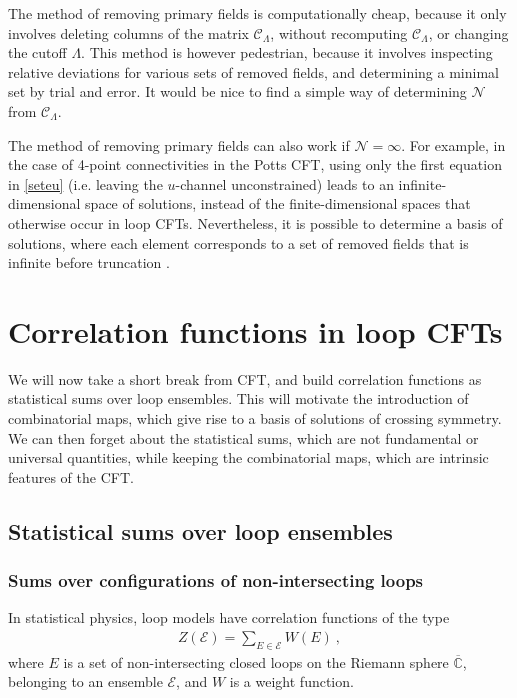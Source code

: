 \documentclass[12pt, a4paper]{article}
\theoremstyle{break}
\begin{document}
The method of removing primary fields is computationally cheap, because it only involves deleting columns of the matrix $\mathcal{C}_\Lambda$, without recomputing $\mathcal{C}_\Lambda$, or changing the cutoff $\Lambda$. This method is however pedestrian, because it involves inspecting relative deviations for various sets of removed fields, and determining a minimal set by trial and error. It would be nice to find a simple way of determining $\mathcal{N}$ from $\mathcal{C}_\Lambda$. 

The method of removing primary fields can also work if $\mathcal{N}=\infty$. For example, in the case of 4-point connectivities in the Potts CFT, using only the first equation in \eqref{seteu} (i.e. leaving the $u$-channel unconstrained) leads to an infinite-dimensional space of solutions, instead of the finite-dimensional spaces that otherwise occur in loop CFTs. Nevertheless, it is possible to determine a basis of solutions, where each element corresponds to a set of removed fields that is infinite before truncation \cite{nr20}.


\section{Correlation functions in loop CFTs} \label{sec:cloop}

We will now take a short break from CFT, and build correlation functions as statistical sums over loop ensembles. This will motivate the introduction of combinatorial maps, which give rise to a basis of solutions of crossing symmetry. We can then forget about the statistical sums, which are not fundamental or universal quantities, while keeping the combinatorial maps, which are intrinsic features of the CFT.

\subsection{Statistical sums over loop ensembles}

\subsubsection{Sums over configurations of non-intersecting loops}

In statistical physics, loop models have correlation functions of the type
\begin{align}
 Z(\mathcal{E}) = \sum_{E\in\mathcal{E}} W(E)\ , 
\end{align}
where $E$ is a set of non-intersecting closed loops on the Riemann sphere $\overline{\mathbb{C}}$, belonging to an ensemble $\mathcal{E}$, and $W$ is a weight function. 
\end{document}
